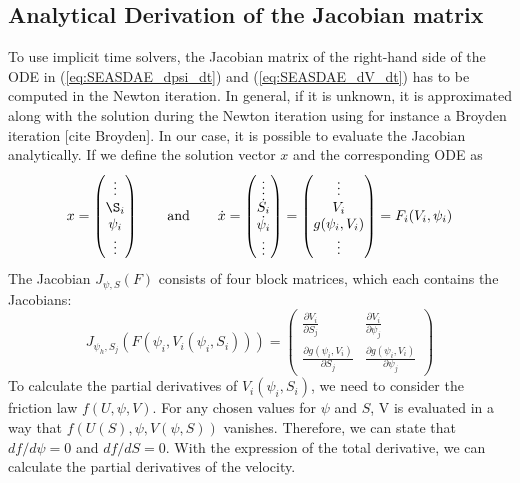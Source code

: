 \documentclass{report}
\begin{document}
\subsection{Analytical Derivation of the Jacobian matrix}
\label{ssec:AnalyticalDerivationOfTheJacobianMatrix}
To use implicit time solvers, the Jacobian matrix of the right-hand side of the ODE in (\ref{eq:SEASDAE_dpsi_dt}) and (\ref{eq:SEASDAE_dV_dt}) has to be computed in the Newton iteration. In general, if it is unknown, it is approximated along with the solution during the Newton iteration using for instance a Broyden iteration [cite Broyden]. In our case, it is possible to evaluate the Jacobian analytically. If we define the solution vector $x$ and the corresponding ODE as 
\begin{equation}
	\label{eq:quantitiesODEForJacobian}
    x = \begin{pmatrix} \vdots \\ \S_i \\ \psi_i \\ \vdots \end{pmatrix}
    \qquad \text{and} \qquad 
    \dot{x} = \begin{pmatrix} \vdots \\ \dot{S_i} \\ \dot{\psi_i} \\ \vdots \end{pmatrix} =
    \begin{pmatrix} \vdots \\ V_i \\ g(\psi_i, V_i) \\ \vdots \end{pmatrix} = F_i(V_i, \psi_i)
\end{equation}
The Jacobian $J_{\psi,S}(F)$ consists of four block matrices, which each contains the Jacobians: 
\begin{equation}
		\label{eq:BlockMatricesJacobian}
    J_{\psi_h,S_j}\left(F\left(\psi_i,V_i(\psi_i,S_i)\right)\right) = \begin{pmatrix} 
        \frac{\partial V_i}{\partial S_j} &
        \frac{\partial V_i}{\partial \psi_j} \\ 
        \frac{\partial g(\psi_i,V_i)}{\partial S_j} &
        \frac{\partial g(\psi_i,V_i)}{\partial \psi_j}  \end{pmatrix}
\end{equation}
To calculate the partial derivatives of $V_i(\psi_i,S_i)$, we need to consider the friction law $f(U, \psi,V)$. For any chosen values for $\psi$ and $S$, V is evaluated in a way that $f(U(S), \psi, V(\psi,S))$ vanishes. Therefore, we can state that $df/d\psi = 0$ and $df/dS = 0$. With the expression of the total derivative, we can calculate the partial derivatives of the velocity. 
\end{document}
